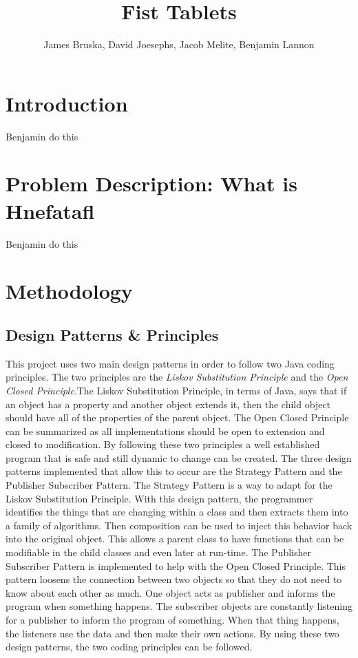 \documentclass{article}
\title{Fist Tablets}
\author{James Bruska, David Joesephs, Jacob Melite, Benjamin Lannon}
\begin{document}
\maketitle
\tableofcontents

\section{Introduction}
Benjamin do this

\section{Problem Description: What is Hnefatafl}
Benjamin do this

\section{Methodology}

\subsection{Design Patterns \& Principles}
	This project uses two main design patterns in order to follow two Java coding principles. The two principles are the \textit{Liskov Substitution Principle} and the \textit{Open Closed Principle}.The Liskov Substitution Principle, in terms of Java, says that if an object has a property and another object extends it, then the child object should have all of the properties of the parent object. The Open Closed Principle can be summarized as all implementations should be open to extension and closed to modification. By following these two principles a well established program that is safe and still dynamic to change can be created. 
	The three design patterns implemented that allow this to occur are the Strategy Pattern and the Publisher Subscriber Pattern. The Strategy Pattern is a way to adapt for the Liskov Substitution Principle. With this design pattern, the programmer identifies the things that are changing within a class and then extracts them into a family of algorithms. Then composition can be used to inject this behavior back into the original object. This allows a parent class to have functions that can be modifiable in the child classes and even later at run-time. The Publisher Subscriber Pattern is implemented to help with the Open Closed Principle. This pattern loosens the connection between two objects so that they do not need to know about each other as much. One object acts as publisher and informs the program when something happens. The subscriber objects are constantly listening for a publisher to inform the program of something. When that thing happens, the listeners use the data and then make their own actions. By using these two design patterns, the two coding principles can be followed.  
\end{document}
